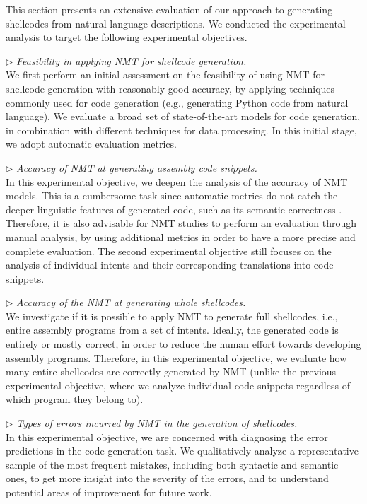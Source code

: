 This section presents an extensive evaluation of our approach to generating shellcodes from natural language descriptions. 
We conducted the experimental analysis to target the following experimental objectives.


\vspace{0.1cm}
\noindent
$\rhd$ \textit{Feasibility in applying NMT for shellcode generation.}\\
We first perform an initial assessment on the feasibility of using NMT for shellcode generation with reasonably good accuracy, by applying techniques commonly used for code generation (e.g., generating Python code from natural language). 
We evaluate a broad set of state-of-the-art models for code generation, in combination with different techniques for data processing. In this initial stage, we adopt automatic evaluation metrics.



\vspace{0.1cm}
\noindent
$\rhd$ \textit{Accuracy of NMT at generating assembly code snippets.}\\
In this experimental objective, we deepen the analysis of the accuracy of NMT models. 
This is a cumbersome task since automatic metrics do not catch the deeper linguistic features of generated code, such as its semantic correctness \cite{DBLP:journals/corr/abs-2105-03311}. Therefore, it is also advisable for NMT studies to perform an evaluation through manual analysis, by using additional metrics in order to have a more precise and complete evaluation. 
The second experimental objective still focuses on the analysis of individual intents and their corresponding translations into code snippets. 





\vspace{0.1cm}
\noindent
$\rhd$ \textit{Accuracy of the NMT at generating whole shellcodes.}\\
We investigate if it is possible to apply NMT to generate full shellcodes, i.e., entire assembly programs from a set of intents. 
Ideally, the generated code is entirely or mostly correct, in order to reduce the human effort towards developing assembly programs. 
Therefore, in this experimental objective, we evaluate how many entire shellcodes are correctly generated by NMT (unlike the previous experimental objective, where we analyze individual code snippets regardless of which program they belong to).


\vspace{0.1cm}
\noindent
$\rhd$ \textit{Types of errors incurred by NMT in the generation of shellcodes.}\\
In this experimental objective, we are concerned with diagnosing the error predictions in the code generation task. We qualitatively analyze a representative sample of the most frequent mistakes, including both syntactic and semantic ones, to get more insight into the severity of the errors, and to understand potential areas of improvement for future work.




